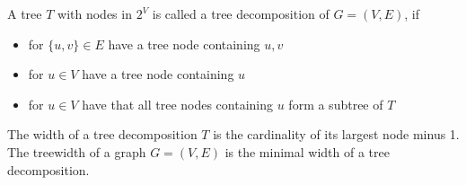 \documentclass{scrartcl}
\begin{document}
A tree $T$ with nodes in $2^V$ is called a tree decomposition of $G = (V, E)$, if
\begin{itemize}
    \item for $\{u, v\} \in E$ have a tree node containing $u, v$
    \item for $u \in V$ have a tree node containing $u$
    \item for $u \in V$ have that all tree nodes containing $u$ form a subtree of $T$
\end{itemize}
The width of a tree decomposition $T$ is the cardinality of its largest node minus 1.
The treewidth of a graph $G = (V, E)$ is the minimal width of a tree decomposition. 
\end{document}
